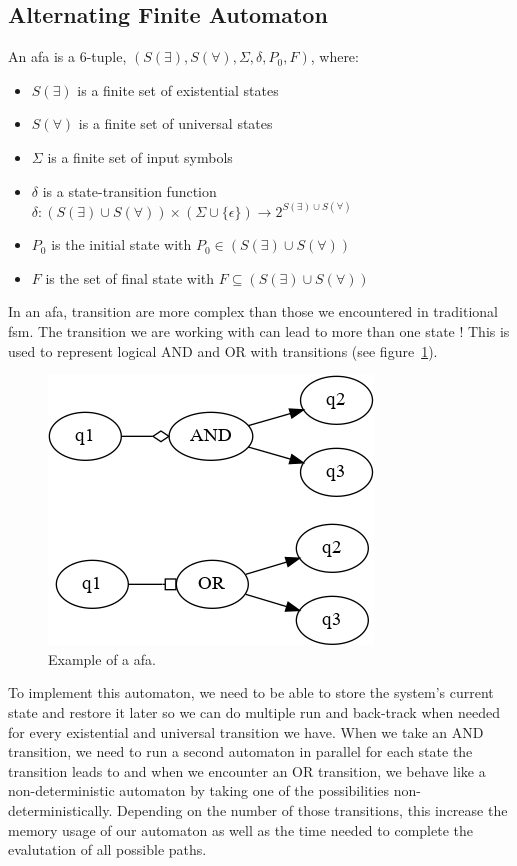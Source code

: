 \documentclass[12pt]{article}
\theoremstyle{definition}
\theoremstyle{definition}
\begin{document}
\subsection{Alternating Finite Automaton}

An \gls{afa} is a 6-tuple, $(S(\exists), S(\forall), \Sigma, \delta, P_0, F)$, where:

\begin{itemize}
\item $S(\exists)$ is a finite set of existential states
\item $S(\forall)$ is a finite set of universal states
\item $\Sigma$ is a finite set of input symbols
\item $\delta$ is a state-transition function $\delta: (S(\exists) \cup S(\forall)) \times (\Sigma \cup \{ \epsilon \}) \rightarrow 2^{S(\exists) \cup S(\forall)}$
\item $P_0$ is the initial state with $P_0 \in (S(\exists) \cup S(\forall))$
\item $F$ is the set of final state with $F \subseteq (S(\exists) \cup S(\forall))$
\end{itemize}

In an \gls{afa}, transition are more complex than those we encountered in traditional \gls{fsm}. The transition we are working with can lead to more than one state ! This is used to represent logical AND and OR with transitions (see figure~\ref{afa}).\\

\begin{figure}
    \centering
    \includegraphics[scale=0.8]{graph/afa.png}
    \caption{Example of a \gls{afa}.}
    \label{afa}
\end{figure}

To implement this automaton, we need to be able to store the system's current state and restore it later so we can do multiple run and back-track when needed for every existential and universal transition we have. When we take an AND transition, we need to run a second automaton in parallel for each state the transition leads to and when we encounter an OR transition, we behave like a non-deterministic automaton by taking one of the possibilities non-deterministically. Depending on the number of those transitions, this increase the memory usage of our automaton as well as the time needed to complete the evalutation of all possible paths.\\
\end{document}

